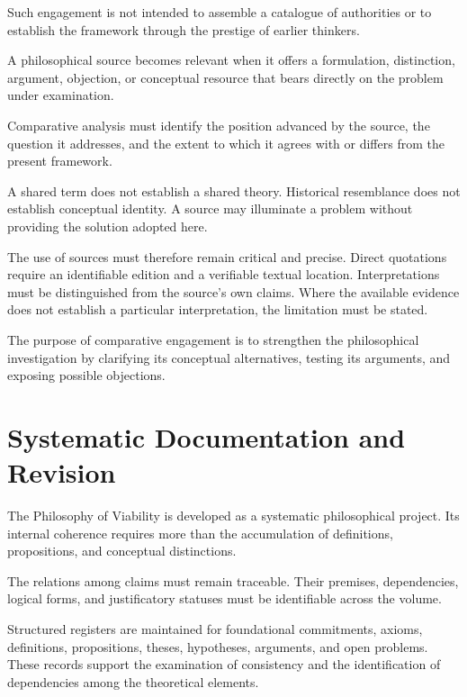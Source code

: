 Such engagement is not intended to
assemble a catalogue of authorities
or to establish the framework through
the prestige of earlier thinkers.

A philosophical source becomes relevant
when it offers a formulation, distinction,
argument, objection, or conceptual
resource that bears directly on the
problem under examination.

Comparative analysis must identify
the position advanced by the source,
the question it addresses, and the
extent to which it agrees with or
differs from the present framework.

A shared term does not establish
a shared theory. Historical resemblance
does not establish conceptual identity.
A source may illuminate a problem
without providing the solution adopted
here.

The use of sources must therefore
remain critical and precise. Direct
quotations require an identifiable
edition and a verifiable textual
location. Interpretations must be
distinguished from the source's own
claims. Where the available evidence
does not establish a particular
interpretation, the limitation must
be stated.

The purpose of comparative engagement
is to strengthen the philosophical
investigation by clarifying its
conceptual alternatives, testing
its arguments, and exposing possible
objections.



\section*{Systematic Documentation and Revision}

The Philosophy of Viability is developed
as a systematic philosophical project.
Its internal coherence requires more
than the accumulation of definitions,
propositions, and conceptual distinctions.

The relations among claims must remain
traceable. Their premises, dependencies,
logical forms, and justificatory statuses
must be identifiable across the volume.

Structured registers are maintained
for foundational commitments, axioms,
definitions, propositions, theses,
hypotheses, arguments, and open problems.
These records support the examination
of consistency and the identification
of dependencies among the theoretical
elements.

